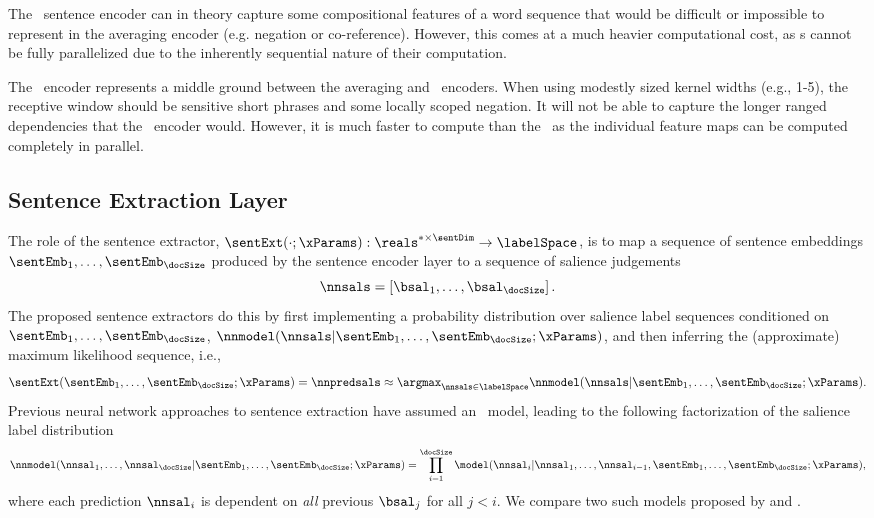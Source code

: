 The \recurrentneuralnetwork~sentence encoder can in theory capture some
compositional features of a word sequence that would be difficult or impossible
to represent in the averaging encoder (e.g. negation or co-reference).
However, this comes at a much heavier computational cost, as
\recurrentneuralnetwork s cannot be fully parallelized due to the inherently
sequential nature of their computation.

The \convolutionalneuralnetwork~encoder represents a middle ground between the
averaging and \recurrentneuralnetwork~encoders. When using modestly sized
kernel widths (e.g., 1-5), the receptive window should be sensitive short
phrases and some locally scoped negation. It will not be able to capture the
longer ranged dependencies that the \recurrentneuralnetwork~encoder would.
However, it is much faster to compute than the \recurrentneuralnetwork~as the
individual feature maps can be computed completely in parallel. 

\subsection{Sentence Extraction Layer} \label{sec:sext}

The role of the sentence extractor, $\sentExt(\cdot; \xParams) : \reals^{*
\times \sentDim} \rightarrow \labelSpace$, is to map a sequence of sentence
embeddings $\sentEmb_1,\ldots,\sentEmb_\docSize$ produced by the sentence
encoder layer to a sequence of salience judgements 
\[
    \nnsals = \left[ \bsal_1,\ldots, \bsal_\docSize\right].
\] %
The proposed sentence extractors do this by first implementing a probability
distribution over salience label sequences conditioned on
$\sentEmb_1,\ldots,\sentEmb_\docSize$,
$\nnmodel(\nnsals|\sentEmb_1,\ldots,\sentEmb_\docSize; \xParams)$, and then
inferring the (approximate) maximum likelihood sequence, i.e., 
\[ 
    \sentExt(\sentEmb_1,\ldots,\sentEmb_\docSize; \xParams) = \nnpredsals \approx \argmax_{\nnsals \in \labelSpace} \nnmodel(\nnsals|\sentEmb_1,\ldots,\sentEmb_\docSize;\xParams).
\]
Previous neural network approaches to sentence extraction have assumed an
\autoregressive~model, leading to the following factorization of the salience
label distribution
\[
    \nnmodel(\nnsal_{1},\ldots,\nnsal_\docSize|\sentEmb_1,\ldots,\sentEmb_\docSize;\xParams)=
      \prod_{i=1}^\docSize 
        \model(\nnsal_i|\nnsal_1,\ldots,\nnsal_{i-1},\sentEmb_1,\ldots,\sentEmb_\docSize;\xParams),
\]
where each prediction $\nnsal_i$ is dependent on \emph{all} previous $\bsal_j$
for all $j < i$. We compare two such models proposed by
\citet{cheng2016neural} and \citet{nallapati2017summarunner}. 

